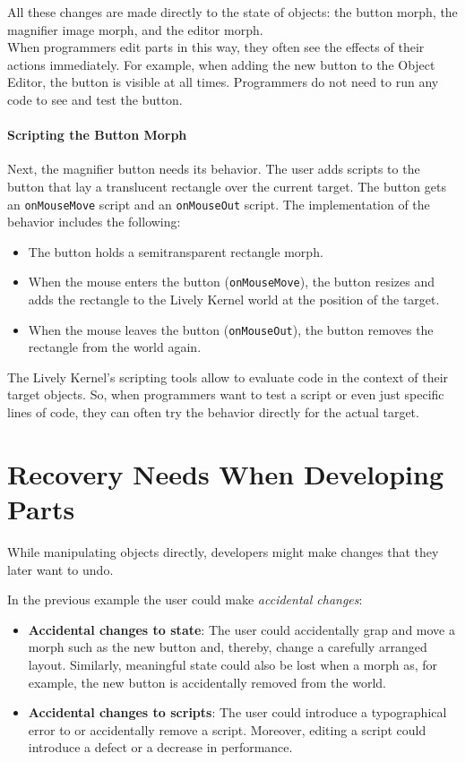 All these changes are made directly to the state of objects: the button morph, the magnifier image morph, and the editor morph.\\
When programmers edit parts in this way, they often see the effects of their actions immediately.
For example, when adding the new button to the Object Editor, the button is visible at all times.
Programmers do not need to run any code to see and test the button.

\paragraph{Scripting the Button Morph}
Next, the magnifier button needs its behavior.
The user adds scripts to the button that lay a translucent rectangle over the current target.
The button gets an \lstinline{onMouseMove} script and an \lstinline{onMouseOut} script.
The implementation of the behavior includes the following: 
\begin{itemize}
    \item The button holds a semitransparent rectangle morph.
    \item When the mouse enters the button (\lstinline{onMouseMove}), the button resizes and adds the rectangle to the Lively Kernel world at the position of the target.
    \item When the mouse leaves the button (\lstinline{onMouseOut}), the button removes the rectangle from the world again.
\end{itemize}
 
The Lively Kernel's scripting tools allow to evaluate code in the context of their target objects.
So, when programmers want to test a script or even just specific lines of code, they can often try the behavior directly for the actual target.


\section{Recovery Needs When Developing Parts}

While manipulating objects directly, developers might make changes that they later want to undo.

In the previous example the user could make \emph{accidental changes}:

\begin{itemize}
    \item \textbf{Accidental changes to state}: The user could accidentally grap and move a morph such as the new button and, thereby, change a carefully arranged layout. Similarly, meaningful state could also be lost when a morph as, for example, the new button is accidentally removed from the world.
    \item \textbf{Accidental changes to scripts}: The user could introduce a typographical error to or accidentally remove a script. Moreover, editing a script could introduce a defect or a decrease in performance.
\end{itemize}


